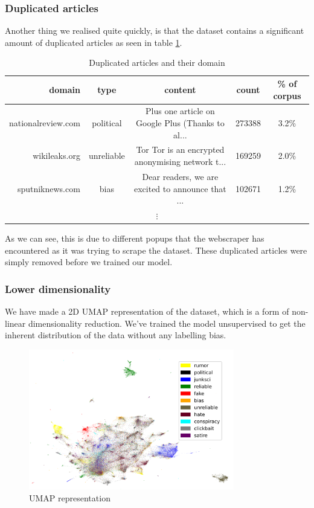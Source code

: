 \subsubsection{Duplicated articles}\label{sec:dup_articles}
Another thing we realised quite quickly, is that the dataset contains a significant amount of duplicated articles as
seen in table \ref{tab:dupart}.

\begin{table}[htpb]
  \centering
  \caption{Duplicated articles and their domain}
  \label{tab:dupart}
  \begin{tabular}{r | c | c| c| c}
      domain & type & content & count&\% of corpus \\ \hline
      nationalreview.com & political & Plus one article on Google Plus (Thanks to al... & 273388 & 3.2\%\\ \hline
      wikileaks.org & unreliable & Tor Tor is an encrypted anonymising network t... & 169259 & 2.0\% \\ \hline
      sputniknews.com & bias & Dear readers, we are excited to announce that ... & 102671 & 1.2\%\\
    \multicolumn{5}{c}{$\vdots$}
  \end{tabular}
\end{table}
As we can see, this is due to different popups that the webscraper has encountered as it
was trying to scrape the dataset. These duplicated articles were simply removed before we trained our model.

\subsubsection{Lower dimensionality}
We have made a 2D UMAP representation of the dataset, which is a form of non-linear dimensionality reduction. We've
trained the model unsupervised to get the inherent distribution of the data without any labelling bias.
\begin{figure}[htpb]
  \centering
  \includegraphics[width=0.8\textwidth]{figures/umapFakeNewsClasses}
  \caption{UMAP representation}
  \label{fig:umap_explore}
\end{figure}

